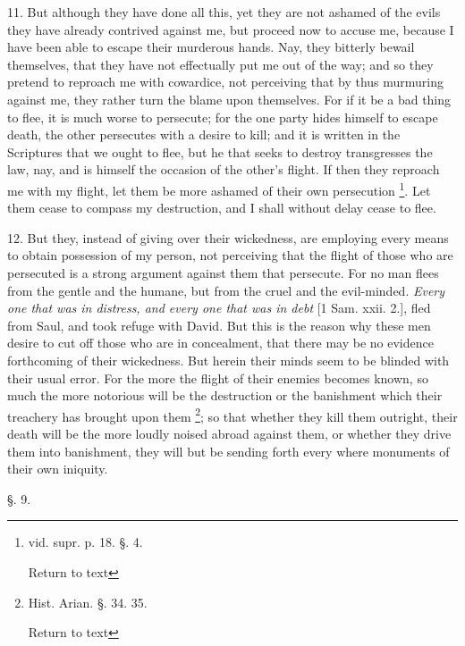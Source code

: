 11. But although they have done all this, yet
they are not ashamed of the evils they have already contrived against
me, but proceed now to accuse me, because I have been able to escape
their murderous hands. Nay, they bitterly bewail themselves, that they
have not effectually put me out of the way; and so they pretend to
reproach me with cowardice, not perceiving that by thus murmuring
against me, they rather turn the blame upon themselves. For if it be a
bad thing to flee, it is much worse to persecute; for the one party
hides himself to escape death, the other persecutes with a desire to
kill; and it is written in the Scriptures that we ought to flee, but
he that seeks to destroy transgresses the law, nay, and is himself the
occasion of the other's flight. If then they reproach me with
my flight, let them be more ashamed of their own persecution \footnote{vid. supr. p. 18. §. 4.

Return to text}. Let them cease to compass my destruction, and I shall without
delay cease to flee.

12. But they, instead of giving over their
wickedness, are employing every means to obtain possession of my
person, not perceiving that the flight of those who are persecuted is
a strong argument against them that persecute. For no man flees from
the gentle and the humane, but from the cruel and the evil-minded. \emph{Every
one that was in distress, and every one that was in debt} [1 Sam.
xxii. 2.], fled from Saul, and took refuge with David. But this is the
reason why these men desire to cut off those who are in concealment,
that there may be no evidence forthcoming of their wickedness. But
herein their minds seem to be blinded with their usual error. For the
more the flight of their enemies becomes known, so much the more
notorious will be the destruction or the banishment which their
treachery has brought upon them \footnote{Hist. Arian. §. 34. 35.

Return to text}; so that whether they kill them outright, their death will be
the more loudly noised abroad against them, or whether they drive them
into banishment, they will but be sending forth every where monuments
of their own iniquity.

§. 9.

